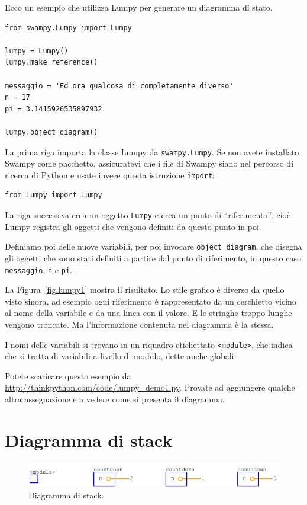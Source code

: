 \documentclass[10pt]{book}
\begin{document}
Ecco un esempio che utilizza Lumpy per generare un diagramma di stato.

\begin{verbatim}
from swampy.Lumpy import Lumpy

lumpy = Lumpy()
lumpy.make_reference()

messaggio = 'Ed ora qualcosa di completamente diverso'
n = 17
pi = 3.1415926535897932

lumpy.object_diagram()
\end{verbatim}

La prima riga importa la classe Lumpy da {\tt swampy.Lumpy}.
Se non avete installato Swampy come pacchetto, assicuratevi che i file di Swampy siano nel percorso di ricerca di Python e usate invece questa istruzione
{\tt import}:

\begin{verbatim}
from Lumpy import Lumpy
\end{verbatim}

La riga successiva crea un oggetto {\tt Lumpy} e crea un punto di ``riferimento'', cioè Lumpy registra gli oggetti che vengono definiti da questo punto in poi.

Definiamo poi delle nuove variabili, per poi invocare \verb"object_diagram",
che disegna gli oggetti che sono stati definiti a partire dal punto di riferimento, in questo caso {\tt messaggio}, {\tt n} e {\tt pi}.

La Figura~\ref{fig.lumpy1} mostra il risultato. Lo stile grafico è diverso da quello visto sinora, ad esempio ogni riferimento è rappresentato da un cerchietto vicino al nome della variabile e da una linea con il valore. E le stringhe troppo lunghe vengono troncate. Ma l'informazione contenuta nel diagramma è la stessa.

I nomi delle variabili si trovano in un riquadro etichettato \verb"<module>", che indica che si tratta di variabili a livello di modulo, dette anche globali.

Potete scaricare questo esempio da
\url{http://thinkpython.com/code/lumpy_demo1.py}.  Provate ad aggiungere qualche altra assegnazione e a vedere come si presenta il diagramma.


\section{Diagramma di stack}

\begin{figure}
\centerline
{\includegraphics[scale=0.7]{figs/lumpydemo2.pdf}}
\caption{Diagramma di stack.}
\label{fig.lumpy2}
\end{figure}
\end{document}
